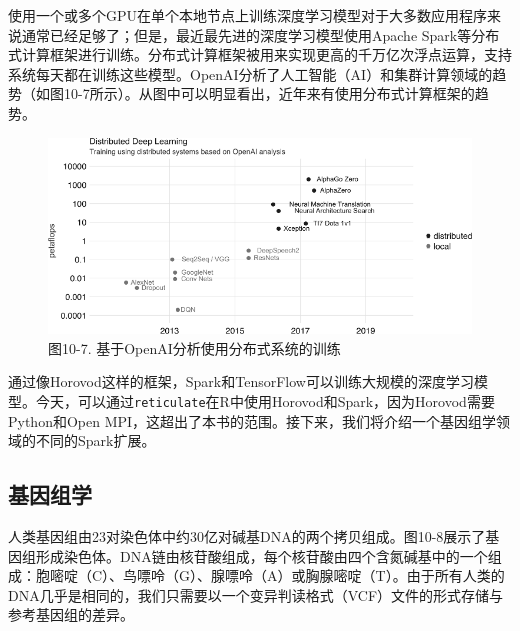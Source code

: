 \documentclass[
]{article}
\begin{document}
使用一个或多个GPU在单个本地节点上训练深度学习模型对于大多数应用程序来说通常已经足够了；但是，最近最先进的深度学习模型使用Apache
Spark等分布式计算框架进行训练。分布式计算框架被用来实现更高的千万亿次浮点运算，支持系统每天都在训练这些模型。OpenAI分析了人工智能（AI）和集群计算领域的趋势（如图10-7所示）。从图中可以明显看出，近年来有使用分布式计算框架的趋势。

\begin{figure}
\centering
\includegraphics{figures/10_7.png}
\caption{图10-7. 基于OpenAI分析使用分布式系统的训练}
\end{figure}

通过像Horovod这样的框架，Spark和TensorFlow可以训练大规模的深度学习模型。今天，可以通过\texttt{reticulate}在R中使用Horovod和Spark，因为Horovod需要Python和Open
MPI，这超出了本书的范围。接下来，我们将介绍一个基因组学领域的不同的Spark扩展。

\hypertarget{ux57faux56e0ux7ec4ux5b66}{%
\subsection{基因组学}\label{ux57faux56e0ux7ec4ux5b66}}

人类基因组由23对染色体中约30亿对碱基DNA的两个拷贝组成。图10-8展示了基因组形成染色体。DNA链由核苷酸组成，每个核苷酸由四个含氮碱基中的一个组成：胞嘧啶（C）、鸟嘌呤（G）、腺嘌呤（A）或胸腺嘧啶（T）。由于所有人类的DNA几乎是相同的，我们只需要以一个变异判读格式（VCF）文件的形式存储与参考基因组的差异。
\end{document}
